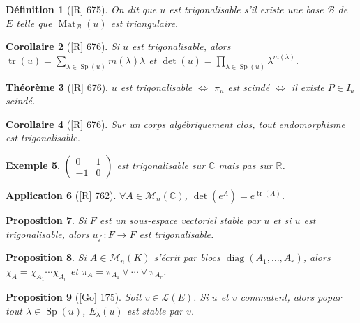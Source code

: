 \documentclass[10pt, a4paper, parskip=full, twoside, twocolumn]{report}
\newtheorem{definition}{Définition}
\newtheorem{theorem}[definition]{Théorème}
\newtheorem{proposition}[definition]{Proposition}
\newtheorem{corollary}[definition]{Corollaire}
\newtheorem{example}[definition]{Exemple}
\newtheorem{application}[definition]{Application}
\newcommand{\IC}{\mathbb{C}}
\newcommand{\IR}{\mathbb{R}}
\newcommand{\M}{\mathcal{M}}
\DeclareMathOperator{\Mat}{Mat}
\DeclareMathOperator{\diag}{diag}
\DeclareMathOperator{\tr}{tr}
\DeclareMathOperator{\Sp}{Sp}
\begin{document}
\begin{definition}[\textnormal{[R] 675}]
	On dit que $u$ est \emph{trigonalisable} s'il existe une base $\mathcal{B}$ de $E$ telle que $\Mat_{\mathcal{B}}(u)$ est triangulaire.
\end{definition}

\begin{corollary}[\textnormal{[R] 676}]
	Si $u$ est trigonalisable, alors $\tr(u) = \sum_{\lambda\in\Sp(u)} m(\lambda)\lambda$ et $\det(u) = \prod_{\lambda\in\Sp(u)} \lambda^{m(\lambda)}$.
\end{corollary}

\begin{theorem}[\textnormal{[R] 676}]
	$u$ est trigonalisable $\iff$ $\pi_u$ est scindé $\iff$ il existe $P\in I_u$ scindé.
\end{theorem}

\begin{corollary}[\textnormal{[R] 676}]
	Sur un corps algébriquement clos, tout endomorphisme est trigonalisable.
\end{corollary}

\begin{example}
	$\begin{pmatrix}
		0&1\\-1&0
	\end{pmatrix}$ est trigonalisable sur $\IC$ mais pas sur $\IR$.
\end{example}

\begin{application}[\textnormal{[R] 762}]
	$\forall A\in \M_n(\IC)$, $\det(e^A) = e^{\tr(A)}$.
\end{application}

\begin{proposition}
	Si $F$ est un sous-espace vectoriel stable par $u$ et si $u$ est trigonalisable, alors $u_f\,\colon F\to F$ est trigonalisable.
\end{proposition}

\begin{proposition}
	Si $A\in\M_n(K)$ s'écrit par blocs $\diag(A_1,\dots,A_r)$,
	alors $\chi_A = \chi_{A_1}\cdots \chi_{A_r}$ et $\pi_A = \pi_{A_1}\vee \cdots \vee \pi_{A_r}$.
\end{proposition}

\begin{proposition}[\textnormal{[Go] 175}]
	Soit $v\in \mathcal{L}(E)$. Si $u$ et $v$ commutent, alors popur tout $\lambda\in\Sp(u)$, $E_{\lambda}(u)$ est stable par $v$.
\end{proposition}
\end{document}

